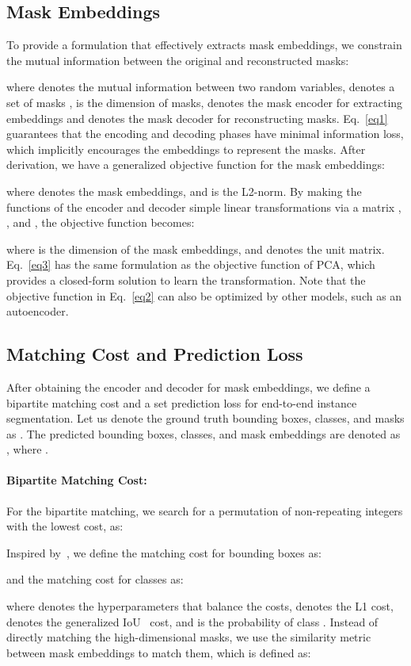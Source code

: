 \documentclass[10pt,twocolumn,letterpaper]{article}
\begin{document}
\subsection{Mask Embeddings}
\label{sec3.1}
To provide a formulation that effectively extracts mask embeddings, we constrain the mutual information between the original and reconstructed masks:

where  denotes the mutual information between two random variables,  denotes a set of masks ,  is the dimension of masks,  denotes the mask encoder for extracting embeddings and  denotes the mask decoder for reconstructing masks.
Eq.~\ref{eq1} guarantees that the encoding and decoding phases have minimal information loss, which implicitly encourages the embeddings to represent the masks.
After derivation, we have a generalized objective function for the mask embeddings:

where  denotes the mask embeddings, and  is the L2-norm.
By making the functions of the encoder and decoder simple linear transformations via a matrix , \ie,  and , the objective function becomes:

where  is the dimension of the mask embeddings, and  denotes the  unit matrix.
Eq.~\ref{eq3} has the same formulation as the objective function of PCA, which provides a closed-form solution to learn the transformation.
Note that the objective function in Eq.~\ref{eq2} can also be optimized by other models, such as an autoencoder.
\subsection{Matching Cost and Prediction Loss}
\label{sec3.2}
After obtaining the encoder and decoder for mask embeddings, we define a bipartite matching cost and a set prediction loss for end-to-end instance segmentation.
Let us denote the ground truth bounding boxes, classes, and masks as .
The predicted bounding boxes, classes, and mask embeddings are denoted as , where .
\paragraph{Bipartite Matching Cost:} For the bipartite matching, we search for a permutation of  non-repeating integers  with the lowest cost, as:

Inspired by~\cite{carion2020end,sun2020sparse}, we define the matching cost for bounding boxes as:

and the matching cost for classes as:

where  denotes the hyperparameters that balance the costs,  denotes the L1 cost,  denotes the generalized IoU~\cite{rezatofighi2019generalized} cost, and  is the probability of class .
Instead of directly matching the high-dimensional masks, we use the similarity metric between mask embeddings to match them, which is defined as:
\end{document}
